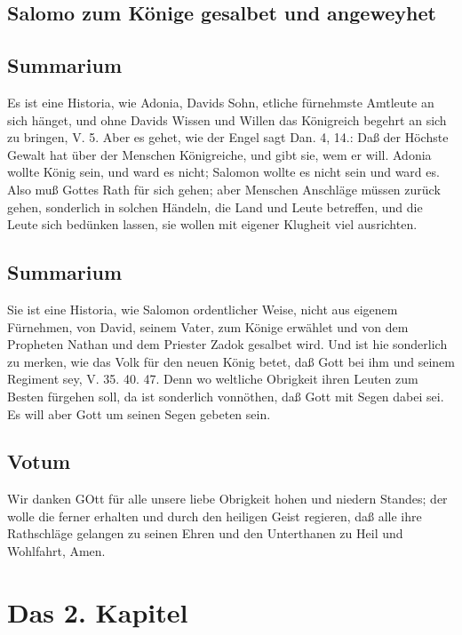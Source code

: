 \section{Salomo zum Könige gesalbet und angeweyhet}

\section{Summarium}

Es ist eine Historia, wie Adonia, Davids Sohn, etliche fürnehmste Amtleute an sich hänget, und ohne Davids Wissen und Willen das Königreich begehrt an sich zu bringen, V. 5. Aber es gehet, wie der Engel sagt Dan. 4, 14.: Daß der Höchste Gewalt hat über der Menschen Königreiche, und gibt sie, wem er will. Adonia wollte König sein, und ward es nicht; Salomon wollte es nicht sein und ward es. Also muß Gottes Rath für sich gehen; aber Menschen Anschläge müssen zurück gehen, sonderlich in solchen Händeln, die Land und Leute betreffen, und die Leute sich bedünken lassen, sie wollen mit eigener Klugheit viel ausrichten.

\section{Summarium}

Sie ist eine Historia, wie Salomon ordentlicher Weise, nicht aus eigenem Fürnehmen, von David, seinem Vater, zum Könige erwählet und von dem Propheten Nathan und dem Priester Zadok gesalbet wird. Und ist hie sonderlich zu merken, wie das Volk für den neuen König betet, daß Gott bei ihm und seinem Regiment sey, V. 35. 40. 47. Denn wo weltliche Obrigkeit ihren Leuten zum Besten fürgehen soll, da ist sonderlich vonnöthen, daß Gott mit
Segen dabei sei. Es will aber Gott um seinen Segen gebeten sein.

\section{Votum}

Wir danken GOtt für alle unsere liebe Obrigkeit hohen und niedern Standes; der wolle die ferner erhalten und durch den heiligen Geist regieren, daß alle ihre Rathschläge gelangen zu seinen Ehren und den Unterthanen zu Heil und Wohlfahrt, Amen.

\chapter{Das 2. Kapitel}

